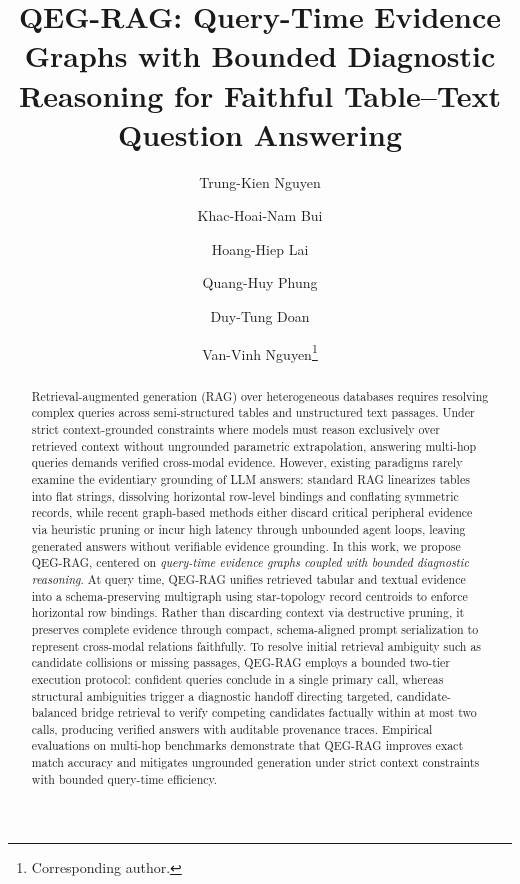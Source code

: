 \documentclass[runningheads]{llncs}
\begin{document}
\title{QEG-RAG: Query-Time Evidence Graphs with Bounded Diagnostic Reasoning for Faithful Table--Text Question Answering}
\author{Trung-Kien Nguyen \and
Khac-Hoai-Nam Bui \and
Hoang-Hiep Lai \and
Quang-Huy Phung \and
Duy-Tung Doan \and
Van-Vinh Nguyen\thanks{Corresponding author.}}
%
%
\maketitle

\begin{abstract}
Retrieval-augmented generation (RAG) over heterogeneous databases requires resolving complex queries across semi-structured tables and unstructured text passages. Under strict context-grounded constraints where models must reason exclusively over retrieved context without ungrounded parametric extrapolation, answering multi-hop queries demands verified cross-modal evidence. However, existing paradigms rarely examine the evidentiary grounding of LLM answers: standard RAG linearizes tables into flat strings, dissolving horizontal row-level bindings and conflating symmetric records, while recent graph-based methods either discard critical peripheral evidence via heuristic pruning or incur high latency through unbounded agent loops, leaving generated answers without verifiable evidence grounding. In this work, we propose QEG-RAG, centered on \emph{query-time evidence graphs coupled with bounded diagnostic reasoning}. At query time, QEG-RAG unifies retrieved tabular and textual evidence into a schema-preserving multigraph using star-topology record centroids to enforce horizontal row bindings. Rather than discarding context via destructive pruning, it preserves complete evidence through compact, schema-aligned prompt serialization to represent cross-modal relations faithfully. To resolve initial retrieval ambiguity such as candidate collisions or missing passages, QEG-RAG employs a bounded two-tier execution protocol: confident queries conclude in a single primary call, whereas structural ambiguities trigger a diagnostic handoff directing targeted, candidate-balanced bridge retrieval to verify competing candidates factually within at most two calls, producing verified answers with auditable provenance traces. Empirical evaluations on multi-hop benchmarks demonstrate that QEG-RAG improves exact match accuracy and mitigates ungrounded generation under strict context constraints with bounded query-time efficiency.

\end{abstract}
\end{document}
